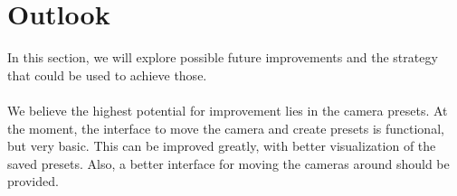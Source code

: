 \section{Outlook}

In this section, we will explore possible future improvements and the strategy that could be used to achieve those.\\\\
We believe the highest potential for improvement lies in the camera presets. At the moment, the interface to move the camera and create presets is functional, but very basic. This can be improved greatly, with better visualization of the saved presets. Also, a better interface for moving the cameras around should be provided.